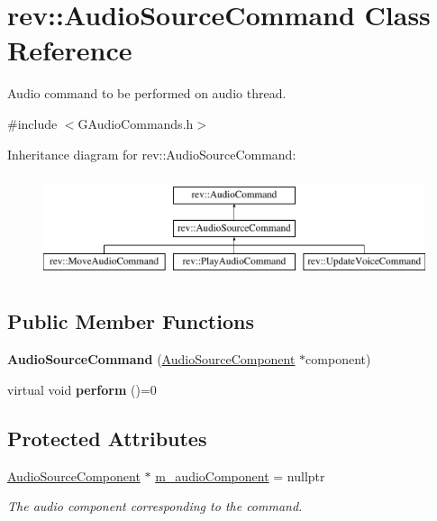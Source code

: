 \hypertarget{classrev_1_1_audio_source_command}{}\section{rev\+::Audio\+Source\+Command Class Reference}
\label{classrev_1_1_audio_source_command}


Audio command to be performed on audio thread.  




{\ttfamily \#include $<$G\+Audio\+Commands.\+h$>$}

Inheritance diagram for rev\+::Audio\+Source\+Command\+:\begin{figure}[H]
\begin{center}
\leavevmode
\includegraphics[height=3.000000cm]{classrev_1_1_audio_source_command}
\end{center}
\end{figure}
\subsection*{Public Member Functions}
\begin{DoxyCompactItemize}
\item 
\mbox{\label{classrev_1_1_audio_source_command_af74f40914ca041968fc986668a63b22a}} 
{\bfseries Audio\+Source\+Command} (\mbox{\hyperlink{classrev_1_1_audio_source_component}{Audio\+Source\+Component}} $\ast$component)
\item 
\mbox{\label{classrev_1_1_audio_source_command_a9c03b6bf57e60ed039bc7e0d1c206661}} 
virtual void {\bfseries perform} ()=0
\end{DoxyCompactItemize}
\subsection*{Protected Attributes}
\begin{DoxyCompactItemize}
\item 
\mbox{\label{classrev_1_1_audio_source_command_a6fd113c28c5ba092b289129683d4f661}} 
\mbox{\hyperlink{classrev_1_1_audio_source_component}{Audio\+Source\+Component}} $\ast$ \mbox{\hyperlink{classrev_1_1_audio_source_command_a6fd113c28c5ba092b289129683d4f661}{m\+\_\+audio\+Component}} = nullptr
\begin{DoxyCompactList}\small\item\em The audio component corresponding to the command. \end{DoxyCompactList}\end{DoxyCompactItemize}


